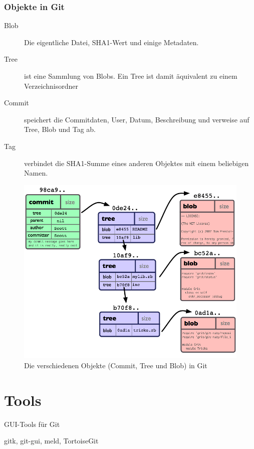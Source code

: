 \documentclass{beamer}
\begin{document}
\begin{frame}\frametitle{Objekte in Git}
\begin{description}
\item[Blob] Die eigentliche Datei, SHA1-Wert und einige Metadaten.
\item[Tree] ist eine Sammlung von Blobs. Ein Tree ist damit äquivalent zu einem Verzeichnisordner
\item[Commit] speichert die Commitdaten, User, Datum, Beschreibung und verweise auf Tree, Blob und Tag ab.
\item[Tag] verbindet die SHA1-Summe eines anderen Objektes mit einem beliebigen Namen. 
\end{description}

\begin{figure}
\includegraphics[scale=0.35]{Bilder/objects-example} 
{\tiny \caption{Die verschiedenen Objekte (Commit, Tree und Blob) in Git}}
\end{figure}
\end{frame}


\section{Tools}
\begin{frame}[c]
\begin{center}
\begin{Huge}
GUI-Tools für Git
\end{Huge}

gitk, git-gui, meld, TortoiseGit
\end{center}
\end{frame}
\end{document}
